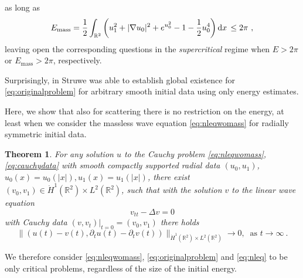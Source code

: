 \documentclass[a4paper]{amsart}
\newtheorem{thm}{Theorem}[section]
\providecommand{\abs}[1]{\lvert #1 \rvert}
\providecommand{\dint}[1]{ {\rm d} #1\,}
\providecommand{\norm}[1]{\lVert #1 \rVert}
\begin{document}
as long as
\begin{equation*}
  E_{\textrm{mass}}
  =
  \frac{1}{2}
  \int_{\mathbb{R}^2}
  \left(
    u_1^2
    +
    \abs{\nabla u_0}^2
    +
    e^{u_0^2} - 1 - \frac{1}{2} u_0^4
  \right)
  \dint{x}
  \leq
  2 \pi
  \ ,
\end{equation*}
leaving open the corresponding questions in the \textit{supercritical}
regime when $E > 2 \pi$ or $E_{\textrm{mass}} > 2 \pi$, respectively.
\par
Surprisingly, in \cite{Struwe10} Struwe was able to establish 
global existence for \eqref{eq:originalproblem} for arbitrary smooth
initial data using only energy estimates.
\par
Here, we show that also for scattering there is no restriction on the
energy, at least when we consider the massless wave equation
\eqref{eq:nleqwomass} for radially symmetric initial data.
\begin{thm}
  For any solution $u$ to the Cauchy problem \eqref{eq:nleqwomass},
  \eqref{eq:cauchydata} with smooth compactly supported radial data
  $(u_0, u_1)$, $u_0(x) = u_0(\abs{x}), u_1(x) = u_1(\abs{x})$, there
  exist $(v_0, v_1) \in \dot{H}^1(\mathbb{R}^2) \times
  L^2(\mathbb{R}^2)$, such that with the solution $v$ to the linear
  wave equation
  \begin{equation}
    v_{tt} - {\Delta} v
    =
    0
    \label{eq:linearwave}
  \end{equation}
  with Cauchy data $(v,v_t)\vert_{t = 0} =
  (v_0,v_1)$ there holds
  \begin{equation}
    \norm{(u(t) - v(t),{\partial}_t u(t) - {\partial}_t v(t))}_{\dot{H}^1({\mathbb{R}}^2) \times
    L^2({\mathbb{R}}^2)} \to 0,\ \text{ as } t \to \infty\ .
    \label{eq:scatteringinnorm}
  \end{equation}
  \label{thm:scattering}
\end{thm}
We therefore consider \eqref{eq:nleqwomass},
\eqref{eq:originalproblem} and \eqref{eq:nleq} to be only critical
problems, regardless of the size of the initial energy.
\end{document}
